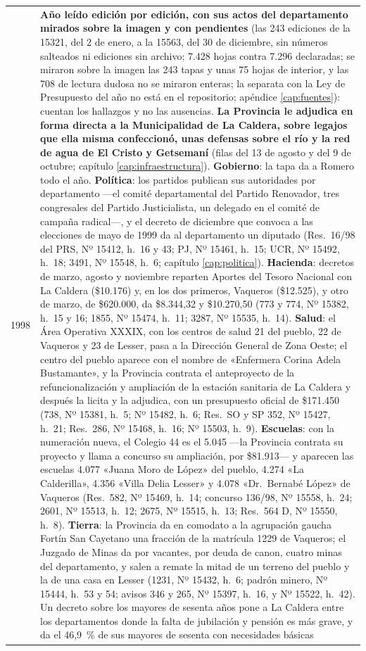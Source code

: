 \begin{longtable}{@{}p{2.7cm}p{10.3cm}@{}}
1998 & \textbf{Año leído edición por edición, con sus actos del departamento mirados sobre la imagen y con pendientes} (las 243 ediciones de la 15321, del 2 de enero, a la 15563, del 30 de diciembre, sin números salteados ni ediciones sin archivo; 7.428 hojas contra 7.296 declaradas; se miraron sobre la imagen las 243 tapas y unas 75 hojas de interior, y las 708 de lectura dudosa no se miraron enteras; la separata con la Ley de Presupuesto del año no está en el repositorio; apéndice \ref{cap:fuentes}): cuentan los hallazgos y no las ausencias. \textbf{La Provincia le adjudica en forma directa a la Municipalidad de La Caldera, sobre legajos que ella misma confeccionó, unas defensas sobre el río y la red de agua de El Cristo y Getsemaní} (filas del 13 de agosto y del 9 de octubre; capítulo \ref{cap:infraestructura}). \textbf{Gobierno}: la tapa da a Romero todo el año. \textbf{Política}: los partidos publican sus autoridades por departamento ---el comité departamental del Partido Renovador, tres congresales del Partido Justicialista, un delegado en el comité de campaña radical---, y el decreto de diciembre que convoca a las elecciones de mayo de 1999 da al departamento un diputado (Res.\ 16/98 del PRS, Nº 15412, h.\ 16 y 43; PJ, Nº 15461, h.\ 15; UCR, Nº 15492, h.\ 18; 3491, Nº 15548, h.\ 6; capítulo \ref{cap:politica}). \textbf{Hacienda}: decretos de marzo, agosto y noviembre reparten Aportes del Tesoro Nacional con La Caldera (\$10.176) y, en los dos primeros, Vaqueros (\$12.525), y otro de marzo, de \$620.000, da \$8.344,32 y \$10.270,50 (773 y 774, Nº 15382, h.\ 15 y 16; 1855, Nº 15474, h.\ 11; 3287, Nº 15535, h.\ 14). \textbf{Salud}: el Área Operativa XXXIX, con los centros de salud 21 del pueblo, 22 de Vaqueros y 23 de Lesser, pasa a la Dirección General de Zona Oeste; el centro del pueblo aparece con el nombre de «Enfermera Corina Adela Bustamante», y la Provincia contrata el anteproyecto de la refuncionalización y ampliación de la estación sanitaria de La Caldera y después la licita y la adjudica, con un presupuesto oficial de \$171.450 (738, Nº 15381, h.\ 5; Nº 15482, h.\ 6; Res.\ SO y SP 352, Nº 15427, h.\ 21; Res.\ 286, Nº 15468, h.\ 16; Nº 15503, h.\ 9). \textbf{Escuelas}: con la numeración nueva, el Colegio 44 es el 5.045 ---la Provincia contrata su proyecto y llama a concurso su ampliación, por \$81.913--- y aparecen las escuelas 4.077 «Juana Moro de López» del pueblo, 4.274 «La Calderilla», 4.356 «Villa Delia Lesser» y 4.078 «Dr.\ Bernabé López» de Vaqueros (Res.\ 582, Nº 15469, h.\ 14; concurso 136/98, Nº 15558, h.\ 24; 2601, Nº 15513, h.\ 12; 2675, Nº 15515, h.\ 13; Res.\ 564 D, Nº 15550, h.\ 8). \textbf{Tierra}: la Provincia da en comodato a la agrupación gaucha Fortín San Cayetano una fracción de la matrícula 1229 de Vaqueros; el Juzgado de Minas da por vacantes, por deuda de canon, cuatro minas del departamento, y salen a remate la mitad de un terreno del pueblo y la de una casa en Lesser (1231, Nº 15432, h.\ 6; padrón minero, Nº 15444, h.\ 53 y 54; avisos 346 y 265, Nº 15397, h.\ 16, y Nº 15522, h.\ 42). Un decreto sobre los mayores de sesenta años pone a La Caldera entre los departamentos donde la falta de jubilación y pensión es más grave, y da el 46,9~\% de sus mayores de sesenta con necesidades básicas 
\end{longtable}

